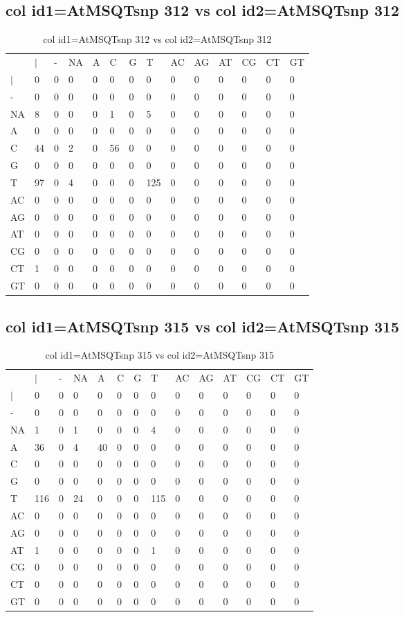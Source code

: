 \subsection{col id1=AtMSQTsnp 312 vs col id2=AtMSQTsnp 312}
\begin{center}
\begin{longtable}{|l|l|l|l|l|l|l|l|l|l|l|l|l|l|}
\caption{col id1=AtMSQTsnp 312 vs col id2=AtMSQTsnp 312} \label{table_dm852}\\
\hline
\\
\hline
&$|$&-&NA&A&C&G&T&AC&AG&AT&CG&CT&GT\\
$|$&0&0&0&0&0&0&0&0&0&0&0&0&0\\
-&0&0&0&0&0&0&0&0&0&0&0&0&0\\
NA&8&0&0&0&1&0&5&0&0&0&0&0&0\\
A&0&0&0&0&0&0&0&0&0&0&0&0&0\\
C&44&0&2&0&56&0&0&0&0&0&0&0&0\\
G&0&0&0&0&0&0&0&0&0&0&0&0&0\\
T&97&0&4&0&0&0&125&0&0&0&0&0&0\\
AC&0&0&0&0&0&0&0&0&0&0&0&0&0\\
AG&0&0&0&0&0&0&0&0&0&0&0&0&0\\
AT&0&0&0&0&0&0&0&0&0&0&0&0&0\\
CG&0&0&0&0&0&0&0&0&0&0&0&0&0\\
CT&1&0&0&0&0&0&0&0&0&0&0&0&0\\
GT&0&0&0&0&0&0&0&0&0&0&0&0&0\\
\hline
\end{longtable}
\end{center}

\subsection{col id1=AtMSQTsnp 315 vs col id2=AtMSQTsnp 315}
\begin{center}
\begin{longtable}{|l|l|l|l|l|l|l|l|l|l|l|l|l|l|}
\caption{col id1=AtMSQTsnp 315 vs col id2=AtMSQTsnp 315} \label{table_dm854}\\
\hline
\\
\hline
&$|$&-&NA&A&C&G&T&AC&AG&AT&CG&CT&GT\\
$|$&0&0&0&0&0&0&0&0&0&0&0&0&0\\
-&0&0&0&0&0&0&0&0&0&0&0&0&0\\
NA&1&0&1&0&0&0&4&0&0&0&0&0&0\\
A&36&0&4&40&0&0&0&0&0&0&0&0&0\\
C&0&0&0&0&0&0&0&0&0&0&0&0&0\\
G&0&0&0&0&0&0&0&0&0&0&0&0&0\\
T&116&0&24&0&0&0&115&0&0&0&0&0&0\\
AC&0&0&0&0&0&0&0&0&0&0&0&0&0\\
AG&0&0&0&0&0&0&0&0&0&0&0&0&0\\
AT&1&0&0&0&0&0&1&0&0&0&0&0&0\\
CG&0&0&0&0&0&0&0&0&0&0&0&0&0\\
CT&0&0&0&0&0&0&0&0&0&0&0&0&0\\
GT&0&0&0&0&0&0&0&0&0&0&0&0&0\\
\hline
\end{longtable}
\end{center}

